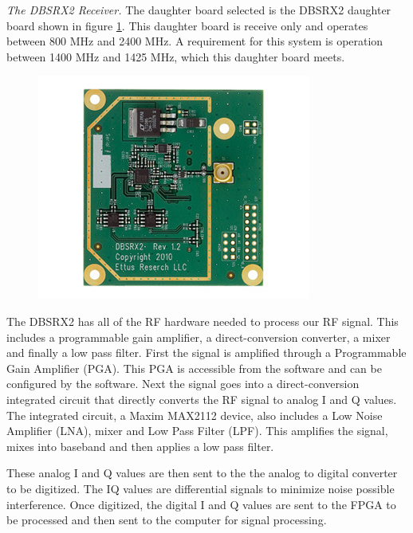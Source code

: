 \emph{The DBSRX2 Receiver.}  The daughter board selected is the DBSRX2 daughter board shown in figure \ref{dbsrx2}.  This daughter board is receive only and operates between 800 MHz and 2400 MHz.  A requirement for this system is operation between 1400 MHz and 1425 MHz, which this daughter board meets.  

{\begin{figure}[h!tb] 
\centering
\includegraphics{Images/dbsrx2.jpg}
\label{dbsrx2}
\end{figure}
}

The DBSRX2 has all of the RF hardware needed to process our RF signal.  This includes a programmable gain amplifier, a direct-conversion converter, a mixer and finally a low pass filter.  First the signal is amplified through a Programmable Gain Amplifier (PGA).  This PGA is accessible from the software and can be configured by the software.  Next the signal goes into a direct-conversion integrated circuit that directly converts the RF signal to analog I and Q values.  The integrated circuit, a Maxim MAX2112 device, also includes a Low Noise Amplifier (LNA), mixer and Low Pass Filter (LPF).  This amplifies the signal, mixes into baseband and then applies a low pass filter.  


These analog I and Q values are then sent to the the analog to digital converter to be digitized.  The IQ values are differential signals to minimize noise possible interference.  Once digitized, the digital I and Q values are sent to the FPGA to be processed and then sent to the computer for signal processing.


